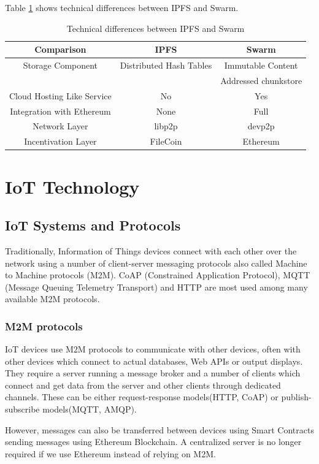 \documentclass[11pt,openright]{report}
\begin{document}
Table \ref{swarm_ipfs_technical} shows technical differences between IPFS and Swarm.
\begin{table}[!htbp]
	\renewcommand{\arraystretch}{1.3}
	\caption{Technical differences between IPFS and Swarm}
	\label{swarm_ipfs_technical}
	\centering
	\begin{tabular}{|c||c|c|}
		\hline
		\bfseries Comparison & \bfseries IPFS & \bfseries Swarm \\
		\hline\hline
		Storage Component & Distributed Hash Tables & Immutable Content \\
		& & Addressed chunkstore \\ \hline
		Cloud Hosting Like Service & No & Yes  \\ \hline
		Integration with Ethereum & None & Full \\ \hline
		Network Layer & libp2p & devp2p \\ \hline
		Incentivation Layer & FileCoin & Ethereum \\ \hline
	\end{tabular}
\end{table}

\chapter{IoT Technology}
\label{chapter:iot_tech}
\section{IoT Systems and Protocols}
Traditionally, Information of Things devices connect with each other over the network using a number of client-server messaging protocols also called Machine to Machine protocols (M2M). CoAP (Constrained Application Protocol), MQTT (Message Queuing Telemetry Transport) and HTTP are most used among many available M2M protocols.

\subsection{M2M protocols}
IoT devices use M2M protocols to communicate with other devices, often with other devices which connect to actual databases, Web APIs or output displays. They require a server running a message broker and a number of clients which connect and get data from the server and other clients through dedicated channels. These can be either request-response models(HTTP, CoAP) or publish-subscribe models(MQTT, AMQP).

However, messages can also be transferred between devices using Smart Contracts sending messages using Ethereum Blockchain. A centralized server is no longer required if we use Ethereum instead of relying on M2M.
\end{document}
